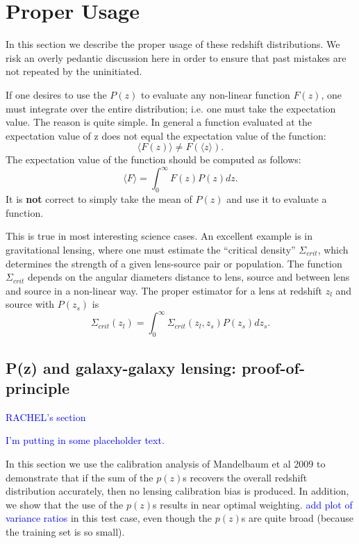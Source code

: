 \documentclass{emulateapj}
\begin{document}
\section{Proper Usage} \label{sec:usage}

In this section we describe the proper usage of these redshift distributions.
We risk an overly pedantic discussion here in order to ensure that past
mistakes are not repeated by the uninitiated.

If one desires to use the $P(z)$ to evaluate any non-linear function $F(z)$,
one must integrate over the entire distribution; i.e. one must take the
expectation value.  The reason is quite simple. In general a function evaluated
at the expectation value of z does not equal the expectation value of the
function:
\begin{equation}
\langle F(z) \rangle \ne F(\langle z \rangle).
\end{equation}
The expectation value of the function should be computed as follows:
\begin{equation}
\langle F \rangle = \int_{0}^{\infty} F(z) P(z) dz.
\end{equation}
It is {\bf not} correct to simply take the mean of $P(z)$ and use it to evaluate
a function.

This is true in most interesting science cases.  An excellent example is in
gravitational lensing, where one must estimate the ``critical density''
$\Sigma_{crit}$, which determines the strength of a given lens-source pair or
population.  The function $\Sigma_{crit}$ depends on the angular diameters
distance to lens, source and between lens and source in a non-linear way.  The
proper estimator for a lens at redshift $z_{l}$ and source with $P(z_s)$ is
\begin{equation}
\Sigma_{crit}(z_l) = \int_{0}^{\infty} \Sigma_{crit}(z_l, z_s) P(z_s) dz_s.
\end{equation}



\subsection{P(z) and galaxy-galaxy lensing: proof-of-principle} \label{sec:pofp}

\textcolor{blue}{RACHEL's section}

\textcolor{blue}{I'm putting in some placeholder text.}


In this section we use the calibration analysis of Mandelbaum et al 2009 to 
demonstrate that if the sum of the $p(z)$s recovers the overall redshift distribution
accurately, then no lensing calibration bias is produced.
In addition, we show that the use of the $p(z)$s results in near optimal weighting.
\textcolor{blue}{add plot of variance ratios} 
in this test case, even though the $p(z)$s are quite broad (because the training set is so small).
\end{document}
